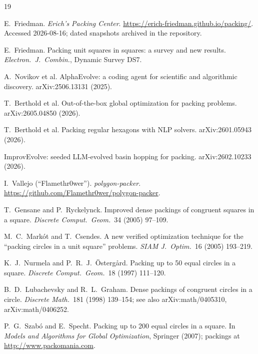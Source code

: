 \documentclass[11pt]{article}
\begin{document}
\begin{thebibliography}{19}\small

 E.~Friedman. \emph{Erich's Packing Center}.
\url{https://erich-friedman.github.io/packing/}. Accessed 2026-08-16; dated
snapshots archived in the repository.

 E.~Friedman. Packing unit squares in squares: a
survey and new results. \emph{Electron.\ J.\ Combin.}, Dynamic Survey DS7.

 A.~Novikov et al. AlphaEvolve: a coding agent for
scientific and algorithmic discovery. arXiv:2506.13131 (2025).

 T.~Berthold et al. Out-of-the-box global optimization
for packing problems. arXiv:2605.04850 (2026). %

 T.~Berthold et al. Packing regular hexagons with
NLP solvers. arXiv:2601.05943 (2026). %

 ImprovEvolve: seeded LLM-evolved basin hopping for
packing. arXiv:2602.10233 (2026). %

 I.~Vallejo (``Flamethr0wer''). \emph{polygon-packer}.
\url{https://github.com/Flamethr0wer/polygon-packer}.

 T.~Gensane and P.~Ryckelynck. Improved dense packings of
congruent squares in a square. \emph{Discrete Comput.\ Geom.}\ 34 (2005)
97--109.

 M.~C.~Mark\'ot and T.~Csendes. A new verified
optimization technique for the ``packing circles in a unit square'' problems.
\emph{SIAM J.\ Optim.}\ 16 (2005) 193--219.

 K.~J.~Nurmela and P.~R.~J.~\"Osterg\aa rd. Packing up to 50
equal circles in a square. \emph{Discrete Comput.\ Geom.}\ 18 (1997) 111--120.

 B.~D.~Lubachevsky and R.~L.~Graham. Dense packings
of congruent circles in a circle. \emph{Discrete Math.}\ 181 (1998) 139--154;
see also arXiv:math/0405310, arXiv:math/0406252.

 P.~G.~Szab\'o and E.~Specht. Packing up to 200 equal circles
in a square. In \emph{Models and Algorithms for Global Optimization}, Springer
(2007); packings at \url{http://www.packomania.com}.


\end{thebibliography}
\end{document}
